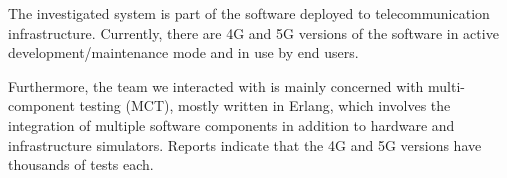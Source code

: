 The investigated system is part of the software deployed to telecommunication infrastructure.
Currently, there are 4G and 5G versions of the software in active development/maintenance mode and in use by end users.

Furthermore, the team we interacted with is mainly concerned with multi-component testing (MCT), mostly written in Erlang, which involves the integration of multiple software components in addition to hardware and infrastructure simulators.
Reports indicate that the 4G and 5G versions have thousands of tests each.



%
%
%
